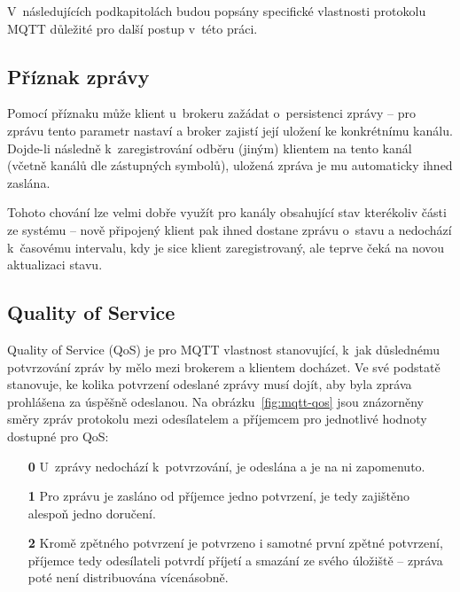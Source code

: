 V~následujících podkapitolách budou popsány specifické vlastnosti protokolu MQTT důležité pro další postup v~této
práci.

\subsection{Příznak zprávy }\label{subsec:priznak-zpravy-retain}
Pomocí příznaku  může klient u~brokeru zažádat o~persistenci zprávy -- pro zprávu tento parametr nastaví a
broker zajistí její uložení ke konkrétnímu kanálu.
Dojde-li následně k~zaregistrování odběru (jiným) klientem na tento kanál (včetně kanálů dle zástupných symbolů),
uložená zpráva je mu automaticky ihned zaslána.

Tohoto chování lze velmi dobře využít pro kanály obsahující stav kterékoliv části ze systému --
nově připojený klient pak ihned dostane zprávu o~stavu a nedochází k~časovému intervalu, kdy je sice klient
zaregistrovaný, ale teprve čeká na novou aktualizaci stavu.

\subsection{Quality of Service}\label{subsec:quality-of-service}
Quality of Service (QoS) je pro MQTT vlastnost stanovující, k~jak důslednému potvrzování zpráv by mělo mezi
brokerem a klientem docházet.
Ve své podstatě stanovuje, ke kolika potvrzení odeslané zprávy musí dojít, aby byla
zpráva prohlášena za úspěšně odeslanou.
Na obrázku~\ref{fig:mqtt-qos} jsou znázorněny směry zpráv protokolu mezi odesílatelem a příjemcem pro jednotlivé
hodnoty dostupné pro QoS:

\begin{enumerate}
    \item[\textbf{0}] U~zprávy nedochází k~potvrzování, je odeslána a je na ni zapomenuto.
    \item[\textbf{1}] Pro zprávu je zasláno od příjemce jedno potvrzení, je tedy zajištěno alespoň jedno doručení.
    \item[\textbf{2}] Kromě zpětného potvrzení je potvrzeno i samotné první zpětné potvrzení, příjemce tedy
    odesílateli potvrdí příjetí a smazání ze svého úložiště -- zpráva poté není distribuována vícenásobně.
\end{enumerate}

